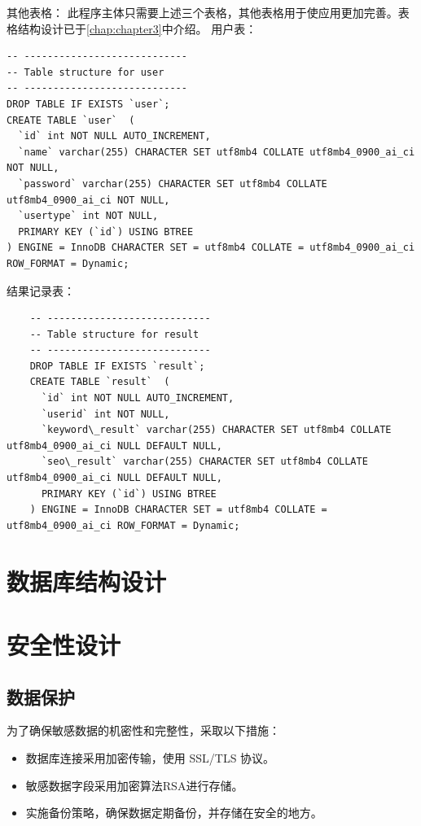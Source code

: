 \documentclass[11pt, a4paper, oneside]{ctexbook}
\begin{document}
其他表格：
此程序主体只需要上述三个表格，其他表格用于使应用更加完善。表格结构设计已于\ref{chap:chapter3}中介绍。
用户表：
\begin{lstlisting}
-- ----------------------------
-- Table structure for user
-- ----------------------------
DROP TABLE IF EXISTS `user`;
CREATE TABLE `user`  (
  `id` int NOT NULL AUTO_INCREMENT,
  `name` varchar(255) CHARACTER SET utf8mb4 COLLATE utf8mb4_0900_ai_ci NOT NULL,
  `password` varchar(255) CHARACTER SET utf8mb4 COLLATE utf8mb4_0900_ai_ci NOT NULL,
  `usertype` int NOT NULL,
  PRIMARY KEY (`id`) USING BTREE
) ENGINE = InnoDB CHARACTER SET = utf8mb4 COLLATE = utf8mb4_0900_ai_ci ROW_FORMAT = Dynamic;
\end{lstlisting}
结果记录表：
\begin{lstlisting}
    -- ----------------------------
    -- Table structure for result
    -- ----------------------------
    DROP TABLE IF EXISTS `result`;
    CREATE TABLE `result`  (
      `id` int NOT NULL AUTO_INCREMENT,
      `userid` int NOT NULL,
      `keyword\_result` varchar(255) CHARACTER SET utf8mb4 COLLATE utf8mb4_0900_ai_ci NULL DEFAULT NULL,
      `seo\_result` varchar(255) CHARACTER SET utf8mb4 COLLATE utf8mb4_0900_ai_ci NULL DEFAULT NULL,
      PRIMARY KEY (`id`) USING BTREE
    ) ENGINE = InnoDB CHARACTER SET = utf8mb4 COLLATE = utf8mb4_0900_ai_ci ROW_FORMAT = Dynamic;
\end{lstlisting}

\section{数据库结构设计}
\section{安全性设计}

\subsection{数据保护}

为了确保敏感数据的机密性和完整性，采取以下措施：

\begin{itemize}
  \item 数据库连接采用加密传输，使用 SSL/TLS 协议。
  \item 敏感数据字段采用加密算法RSA进行存储。
  \item 实施备份策略，确保数据定期备份，并存储在安全的地方。
\end{itemize}
\end{document}
